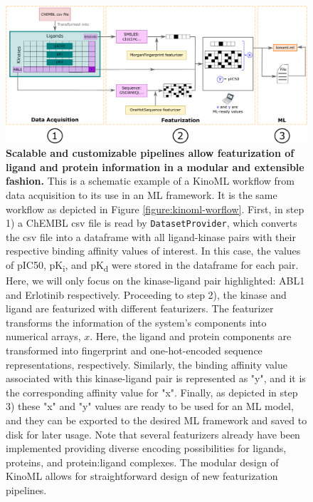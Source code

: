 \documentclass[9pt,lessons]{livecoms}
\begin{document}
\begin{figure}[ht]
    \centering
    \includegraphics[width=.8\textwidth]{figures/kinoml_tech_paper_fig_2_v4.pdf}
    \caption{\label{fig:featurization}
    \textbf{Scalable and customizable pipelines allow featurization of ligand and protein information in a modular and extensible fashion.}
    This is a schematic example of a KinoML workflow from data acquisition to its use in an ML framework. It is the same workflow as depicted in Figure \ref{figure:kinoml-worflow}. First, in step 1) a ChEMBL csv file is read by \texttt{DatasetProvider}, which converts the csv file into a dataframe with all ligand-kinase pairs with their respective binding affinity values of interest. In this case, the values of pIC50, pK\textsubscript{i}, and pK\textsubscript{d} were stored in the dataframe for each pair. Here, we will only focus on the kinase-ligand pair highlighted: ABL1 and Erlotinib respectively. Proceeding to step 2), the kinase and ligand are featurized with different featurizers.  The featurizer transforms the information of the system's components into numerical arrays, $x$. Here, the ligand and protein components are transformed into fingerprint and one-hot-encoded sequence representations, respectively. Similarly, the binding affinity value associated with this kinase-ligand pair is represented as "y",  and it is the corresponding affinity value for "x". Finally, as depicted in step 3) these "x" and "y" values are ready to be used for an ML model, and they can be exported to the desired ML framework and saved to disk for later usage. Note that several featurizers already have been implemented providing diverse encoding possibilities for ligands, proteins, and protein:ligand complexes. The modular design of KinoML allows for straightforward design of new featurization pipelines.}
\end{figure}
\end{document}

